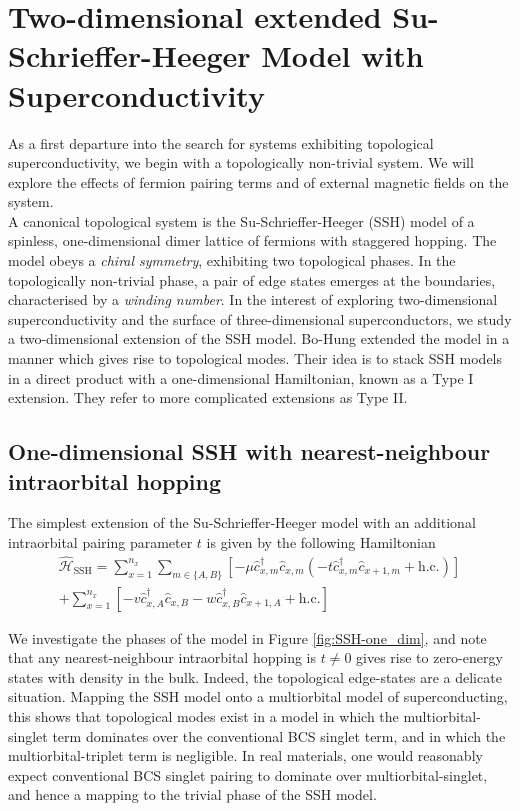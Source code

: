 \chapter{\label{ch:SSH}Two-dimensional extended Su-Schrieffer-Heeger Model with Superconductivity}
As a first departure into the search for systems exhibiting topological 
superconductivity, we begin with a topologically non-trivial system.
We will explore the effects of fermion pairing terms and of external 
magnetic fields on the system.\\
A canonical topological system is the Su-Schrieffer-Heeger (SSH) model of a 
spinless, one-dimensional dimer lattice of fermions with staggered hopping. 
The model obeys a {\it chiral symmetry}, exhibiting two topological phases. 
In the topologically non-trivial phase, a pair of edge states emerges at 
the boundaries, characterised by a {\it winding number}. 
In the interest of exploring two-dimensional superconductivity and the
surface of three-dimensional superconductors, we study a two-dimensional
extension of the SSH model. Bo-Hung extended the model in a manner which 
gives rise to topological modes. Their idea is to stack SSH models in a 
direct product with a one-dimensional Hamiltonian, known as a Type I 
extension. They refer to more complicated extensions as Type II.\\

\section{\label{sec:SSH} One-dimensional SSH with nearest-neighbour intraorbital hopping}
The simplest extension of the Su-Schrieffer-Heeger model with an additional
intraorbital pairing parameter $t$ is given by the following Hamiltonian
\begin{multline}
    \hat{\mathcal H}_\text{SSH} =  
    \sum_{x=1}^{n_x} \sum_{m\in\{A,B\}} 
    \left[
-\mu \hat c_{x, m}^\dagger \hat c_{x, m}
(-t \hat c_{x, m}^\dagger \hat c_{x+1, m} 
+\text{h.c.})
\right]\\
    +
    \sum_{x=1}^{n_x}
    \left[
    -v \hat c_{x, A}^\dagger \hat c_{x, B}
    -w \hat c_{x, B}^\dagger \hat c_{x+1, A}
    +\text{h.c.}
    \right]
\label{eq:one-dimensional_SSH}
\end{multline}

We investigate the phases of the model in Figure \ref{fig:SSH-one_dim}, and note 
that any nearest-neighbour intraorbital hopping is $t\neq0$ gives rise to 
zero-energy states with density in the bulk. Indeed, the topological edge-states
are a delicate situation. Mapping the SSH model onto a multiorbital model of
superconducting, this shows that topological modes exist in a model in which
the multiorbital-singlet term dominates over the conventional BCS singlet term,
and in which the multiorbital-triplet term is negligible. 
In real materials, one would reasonably expect conventional BCS singlet pairing 
to dominate over multiorbital-singlet, and hence a mapping to the trivial
phase of the SSH model.

